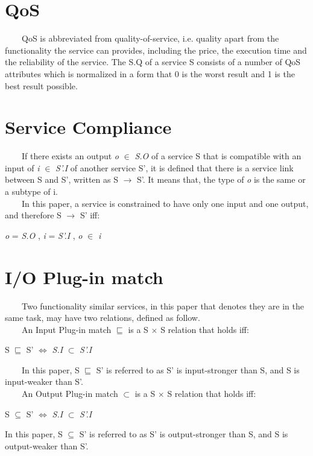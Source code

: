 \documentclass[senior,final,11pt]{iscs-thesis}
\begin{document}
\section{QoS}
~~~~QoS is abbreviated from quality-of-service, i.e. quality apart from the functionality the service can provides, including the price, the execution time and the reliability of the service.
The S.Q of a service S consists of a number of QoS attributes which is normalized in a form that 0 is the worst result and 1 is the best result possible.

\section{Service Compliance}
~~~~If there exists an output {\em o} $\in$ {\em S.O} of a service S that is compatible with an input of {\em i}  $\in$ {\em S'.I} of another service S', it is defined that there is a service link between S and S', written as S $\to$ S'. It means that, the type of {\em o} is the same or a subtype of i. \\
~~~~In this paper, a service is constrained to have only one input and one output, and therefore S $\to$ S' iff:
\begin{center}
{\em o} = {\em S.O} ,  {\em i} = {\em S'.I} ,  {\em o} $\in$ {\em i}
\end{center}

\section{I/O Plug-in match}
~~~~Two functionality similar services, in this paper that denotes they are in the same task, may have two relations, defined as follow\cite{10}.\\
~~~~An Input Plug-in match $\sqsubseteq$ is a S $\times$ S relation that holds iff:
\begin{center}
S $\sqsubseteq$ S'  $\Leftrightarrow$ {\em S.I} $\subset$ {\em S'.I}
\end{center}
~~~~In this paper, S $\sqsubseteq$ S' is referred to as S' is input-stronger than S, and S is input-weaker than S'.\\
~~~~An Output Plug-in match $\subset$ is a S $\times$ S relation that holds iff:
\begin{center}
S $\subseteq$ S' $\Leftrightarrow$ {\em S.I} $\subset$ {\em S'.I}
\end{center}

In this paper, S $\subseteq$ S' is referred to as S' is output-stronger than S, and S is output-weaker than S'.\\
\end{document}
